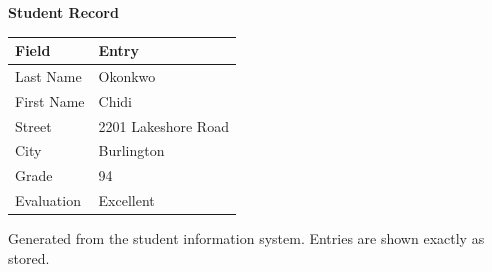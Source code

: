 \documentclass[11pt]{article}
\begin{document}
\begin{center}
{\large\bfseries Student Record}
\end{center}

\vspace{1em}

\begin{center}
\begin{tabular}{@{}ll@{}}
\toprule
\textbf{Field} & \textbf{Entry} \\
\midrule
Last Name   & Okonkwo \\
First Name  & Chidi \\
Street      & 2201 Lakeshore Road \\
City        & Burlington \\
Grade       & 94 \\
Evaluation  & Excellent \\
\bottomrule
\end{tabular}
\end{center}

\vspace{2em}

{\footnotesize Generated from the student information system. Entries are shown
exactly as stored.}
\end{document}
